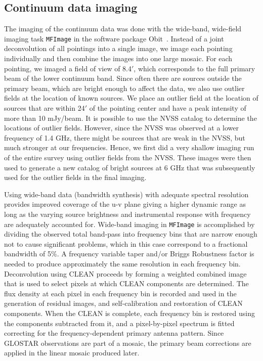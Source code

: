 \documentclass{aa}
\begin{document}
\subsection{Continuum data imaging}
The imaging of the continuum data was done with the wide-band, wide-field imaging task \texttt{MFImage} 
in the software package Obit~\citep{Cotton2008}. Instead of a joint deconvolution of all pointings
into a single image, we image each pointing individually and then combine the images into one large mosaic.
For each pointing, we imaged a field of view of 8.4$'$, which corresponds to the full primary beam of the
lower continuum band. Since often there are sources outside the primary beam, which are bright enough to
affect the data, we also use outlier fields at the location of known sources. We place an outlier field
at the location of sources that are within 24$'$ of the pointing center and have a peak intensity of more than
10 mJy/beam. It is possible to  use the NVSS catalog \citep{CondonCottonGreisen1998} to determine the locations of outlier fields. However, since the NVSS
was observed at a lower frequency of 1.4 GHz, there might be sources that are weak in the NVSS, but much
stronger at our frequencies. Hence, we first did a very shallow imaging run of the entire survey using outlier
fields from the NVSS. These images were then used to generate a new catalog of bright sources at 6 GHz that was subsequently used for the outlier fields in the final imaging. 

Using wide-band data (bandwidth synthesis) with adequate spectral resolution provides improved coverage of the u-v plane giving a higher dynamic range as long as the varying source brightness and instrumental response with frequency are adequately accounted for. Wide-band imaging in \texttt{MFImage} is accomplished by dividing the observed total band-pass into frequency bins that are narrow enough not to cause significant problems, which in this case correspond to a fractional bandwidth of 5\%. A frequency variable taper and/or Briggs Robustness factor is needed to produce approximately the same resolution in each frequency bin. Deconvolution using CLEAN proceeds by forming a weighted combined image that is used to select pixels at which CLEAN components are determined. The flux density at each pixel in each frequency bin is recorded and used in the generation of residual images, and  self-calibration and  restoration of CLEAN components. When the CLEAN is complete, each frequency bin is restored
using the components subtracted from it, and a pixel-by-pixel spectrum is fitted correcting for the frequency-dependent primary antenna pattern. Since GLOSTAR observations are part of a mosaic, the primary beam corrections are applied in the linear mosaic produced later.
\end{document}
